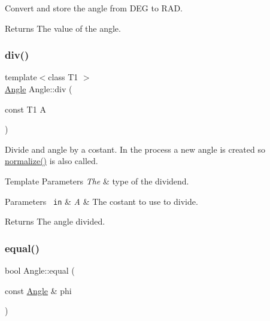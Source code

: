 Convert and store the angle from D\+EG to R\+AD. 

\begin{DoxyReturn}{Returns}
The value of the angle. 
\end{DoxyReturn}
\mbox{\label{class_angle_accc4f9c0df6965dc1fecab234d30b348}} 
\subsubsection{\texorpdfstring{div()}{div()}}
{\footnotesize\ttfamily template$<$class T1 $>$ \\
\mbox{\hyperlink{class_angle}{Angle}} Angle\+::div (\begin{DoxyParamCaption}\item[{const T1}]{A }\end{DoxyParamCaption})\hspace{0.3cm}{\ttfamily [inline]}}



Divide and angle by a costant. In the process a new angle is created so {\ttfamily \mbox{\hyperlink{class_angle_a449fc0638ca2e26b4a57d1cce95788e8}{normalize()}}} is also called. 


\begin{DoxyTemplParams}{Template Parameters}
{\em The} & type of the dividend. \\
\hline
\end{DoxyTemplParams}

\begin{DoxyParams}[1]{Parameters}
\mbox{\texttt{ in}}  & {\em A} & The costant to use to divide. \\
\hline
\end{DoxyParams}
\begin{DoxyReturn}{Returns}
The angle divided. 
\end{DoxyReturn}
\mbox{\label{class_angle_a21d2e7c68957afdd5c7edf3efd3e0bdc}} 
\subsubsection{\texorpdfstring{equal()}{equal()}}
{\footnotesize\ttfamily bool Angle\+::equal (\begin{DoxyParamCaption}\item[{const \mbox{\hyperlink{class_angle}{Angle}} \&}]{phi }\end{DoxyParamCaption})\hspace{0.3cm}{\ttfamily [inline]}}

